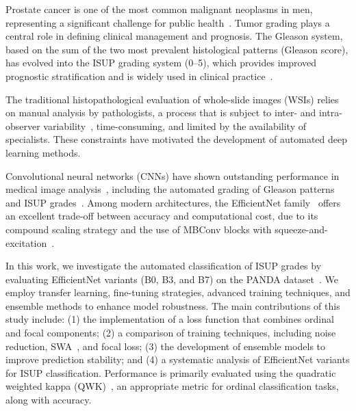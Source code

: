 Prostate cancer is one of the most common malignant neoplasms in men, representing a significant challenge for public health~\cite{ref-siegel2024}. Tumor grading plays a central role in defining clinical management and prognosis. The Gleason system, based on the sum of the two most prevalent histological patterns (Gleason score), has evolved into the ISUP grading system (0–5), which provides improved prognostic stratification and is widely used in clinical practice~\cite{ref-epstein2016}.

The traditional histopathological evaluation of whole-slide images (WSIs) relies on manual analysis by pathologists, a process that is subject to inter- and intra-observer variability~\cite{ref-bulten2020}, time-consuming, and limited by the availability of specialists. These constraints have motivated the development of automated deep learning methods.

Convolutional neural networks (CNNs) have shown outstanding performance in medical image analysis~\cite{ref-campanella2019}, including the automated grading of Gleason patterns and ISUP grades~\cite{ref-nagpal2019,ref-bulten2020}. Among modern architectures, the EfficientNet family~\cite{ref-tan2019} offers an excellent trade-off between accuracy and computational cost, due to its compound scaling strategy and the use of MBConv blocks with squeeze-and-excitation~\cite{ref-hu2018}.


In this work, we investigate the automated classification of ISUP grades by evaluating EfficientNet variants (B0, B3, and B7) on the PANDA dataset~\cite{ref-panda2020}. We employ transfer learning, fine-tuning strategies, advanced training techniques, and ensemble methods to enhance model robustness.
The main contributions of this study include: (1) the implementation of a loss function that combines ordinal and focal components; (2) a comparison of training techniques, including noise reduction, SWA~\cite{ref-izmailov2018}, and focal loss; (3) the development of ensemble models to improve prediction stability; and (4) a systematic analysis of EfficientNet variants for ISUP classification. Performance is primarily evaluated using the quadratic weighted kappa (QWK)~\cite{ref-cohen1968}, an appropriate metric for ordinal classification tasks, along with accuracy.